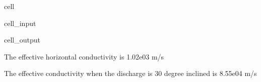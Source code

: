 \documentclass[letterpaper,10pt,english]{jupyterBook}
\begin{document}
\begin{sphinxuseclass}{cell}
\begin{sphinxVerbatimInput}
\begin{sphinxuseclass}{cell_input}
\end{sphinxuseclass}\end{sphinxVerbatimInput}
\begin{sphinxVerbatimOutput}

\begin{sphinxuseclass}{cell_output}
\begin{sphinxVerbatim}[commandchars=\\\{\}]

The effective horizontal conductivity is 1.02e\PYGZhy{}03 m/s 

The effective conductivity when the discharge is 30 degree inclined is 8.55e\PYGZhy{}04 m/s
\end{sphinxVerbatim}

\end{sphinxuseclass}\end{sphinxVerbatimOutput}

\end{sphinxuseclass}
\end{document}
